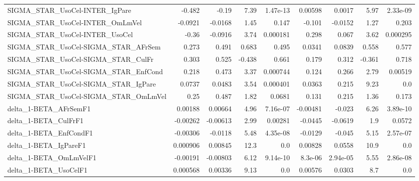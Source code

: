 \begin{tabular}{lrrrrrrrr}
SIGMA\_STAR\_UsoCel-INTER\_IgPare        &      -0.482 &        -0.19 &    7.39 & 1.47e-13 &    0.00598 &      0.0017 &         5.97 &      2.33e-09 \\
SIGMA\_STAR\_UsoCel-INTER\_OmLmVel       &     -0.0921 &      -0.0168 &    1.45 &    0.147 &     -0.101 &     -0.0152 &         1.27 &         0.203 \\
SIGMA\_STAR\_UsoCel-INTER\_UsoCel        &       -0.36 &      -0.0916 &    3.74 & 0.000181 &      0.298 &       0.067 &         3.62 &      0.000295 \\
SIGMA\_STAR\_UsoCel-SIGMA\_STAR\_AFrSem   &       0.273 &        0.491 &   0.683 &    0.495 &     0.0341 &      0.0839 &        0.558 &         0.577 \\
SIGMA\_STAR\_UsoCel-SIGMA\_STAR\_CulFr    &       0.303 &        0.525 &  -0.438 &    0.661 &      0.179 &       0.312 &       -0.361 &         0.718 \\
SIGMA\_STAR\_UsoCel-SIGMA\_STAR\_EnfCond  &       0.218 &        0.473 &    3.37 & 0.000744 &      0.124 &       0.266 &         2.79 &       0.00519 \\
SIGMA\_STAR\_UsoCel-SIGMA\_STAR\_IgPare   &      0.0737 &       0.0483 &    3.54 & 0.000401 &     0.0363 &       0.215 &         9.23 &           0.0 \\
SIGMA\_STAR\_UsoCel-SIGMA\_STAR\_OmLmVel  &        0.25 &        0.487 &    1.82 &   0.0681 &      0.131 &       0.215 &         1.36 &         0.173 \\
delta\_1-BETA\_AFrSemF1                 &     0.00188 &      0.00664 &    4.96 & 7.16e-07 &   -0.00481 &      -0.023 &         6.26 &      3.89e-10 \\
delta\_1-BETA\_CulFrF1                  &    -0.00262 &     -0.00613 &    2.99 &  0.00281 &    -0.0445 &     -0.0619 &          1.9 &        0.0572 \\
delta\_1-BETA\_EnfCondF1                &    -0.00306 &      -0.0118 &    5.48 & 4.35e-08 &    -0.0129 &      -0.045 &         5.15 &      2.57e-07 \\
delta\_1-BETA\_IgPareF1                 &    0.000906 &      0.00845 &    12.3 &      0.0 &    0.00828 &      0.0558 &         10.9 &           0.0 \\
delta\_1-BETA\_OmLmVelF1                &    -0.00191 &     -0.00803 &    6.12 & 9.14e-10 &    8.3e-06 &    2.94e-05 &         5.55 &      2.86e-08 \\
delta\_1-BETA\_UsoCelF1                 &    0.000568 &      0.00336 &    9.13 &      0.0 &    0.00576 &      0.0303 &          8.7 &           0.0 \\

\end{tabular}
